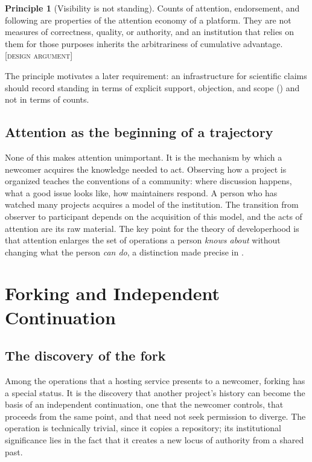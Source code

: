 \documentclass[11pt,twoside,openright]{book}
\theoremstyle{plain}
\theoremstyle{definition}
\newtheorem{principle}[theorem]{Principle}
\theoremstyle{remark}
\newcommand{\Design}{\textup{\textsc{[design argument]}}}
\begin{document}
\begin{principle}[Visibility is not standing]\label{pr:visibility}
Counts of attention, endorsement, and following are properties of the attention economy of a platform. They are not measures of correctness, quality, or authority, and an institution that relies on them for those purposes inherits the arbitrariness of cumulative advantage.
\Design{}
\end{principle}

The principle motivates a later requirement: an infrastructure for scientific claims should record standing in terms of explicit support, objection, and scope () and not in terms of counts.

\section{Attention as the beginning of a trajectory}

None of this makes attention unimportant. It is the mechanism by which a newcomer acquires the knowledge needed to act. Observing how a project is organized teaches the conventions of a community: where discussion happens, what a good issue looks like, how maintainers respond. A person who has watched many projects acquires a model of the institution. The transition from observer to participant depends on the acquisition of this model, and the acts of attention are its raw material. The key point for the theory of developerhood is that attention enlarges the set of operations a person \emph{knows about} without changing what the person \emph{can do}, a distinction made precise in .

\chapter{Forking and Independent Continuation}\label{ch:forking}

\section{The discovery of the fork}

Among the operations that a hosting service presents to a newcomer, forking has a special status. It is the discovery that another project's history can become the basis of an independent continuation, one that the newcomer controls, that proceeds from the same point, and that need not seek permission to diverge. The operation is technically trivial, since it copies a repository; its institutional significance lies in the fact that it creates a new locus of authority from a shared past.
\end{document}
